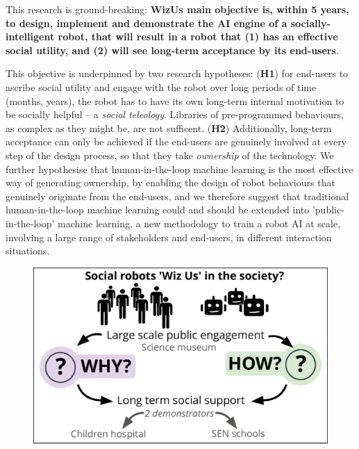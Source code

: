 \documentclass[11pt,a4paper]{report}
\newcommand{\project}{WizUs\xspace}
\begin{document}
This research is ground-breaking: \textbf{\project main objective is, within 5
years, to design, implement and demonstrate the AI engine of a
socially-intelligent robot, that will result in a robot that (1) has an
effective social utility, and (2) will see long-term acceptance by its
end-users}.

This objective is underpinned by two research hypotheses: (\textbf{H1}) for
end-users to ascribe social utility and engage with the robot over long periods
of time (months, years), the robot has to have its own long-term internal
motivation to be socially helpful -- a \emph{social teleology}. Libraries of
pre-programmed behaviours, as complex as they might be, are not sufficent.
(\textbf{H2}) Additionally, long-term acceptance can only be achieved if the
end-users are genuinely involved at every step of the design process, so that
they take \emph{ownership} of the technology. We further hypothesise that
human-in-the-loop machine learning is the most effective way of generating
ownership, by enabling the design of robot behaviours that genuinely originate
from the end-users, and we therefore suggest that traditional human-in-the-loop
machine learning could and should be extended into 'public-in-the-loop' machine
learning, a new methodology to train a robot AI at scale, involving a large
range of stakeholders and end-users, in different interaction situations.





\begin{figure}
    \centering
    \includegraphics[width=0.9\linewidth]{concept}
    \label{fig|concept}
\end{figure}
\end{document}
